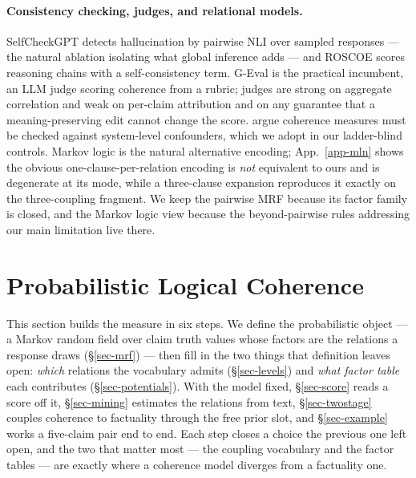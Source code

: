 \paragraph{Consistency checking, judges, and relational models.} SelfCheckGPT \citep{selfcheckgpt} detects
hallucination by pairwise NLI over sampled responses --- the natural ablation isolating what global inference
adds --- and ROSCOE \citep{roscoe} scores reasoning chains with a self-consistency term. G-Eval \citep{geval} is
the practical incumbent, an LLM judge scoring coherence from a rubric; judges are strong on aggregate
correlation and weak on per-claim attribution and on any guarantee that a meaning-preserving edit cannot change
the score. \citet{steenmarkert} argue coherence measures must be checked against system-level confounders,
which we adopt in our ladder-blind controls. Markov logic \citep{mln} is the natural alternative encoding;
App.~\ref{app-mln} shows the obvious one-clause-per-relation encoding is \emph{not} equivalent to ours and is
degenerate at its mode, while a three-clause expansion reproduces it exactly on the three-coupling fragment. We
keep the pairwise MRF because its factor family is closed, and the Markov logic view because the
beyond-pairwise rules addressing our main limitation live there.

\section{Probabilistic Logical Coherence}
\label{sec-coherence}

This section builds the measure in six steps. We define the probabilistic object --- a Markov random field over
claim truth values whose factors are the relations a response draws (\S\ref{sec-mrf}) --- then fill in the two
things that definition leaves open: \emph{which} relations the vocabulary admits (\S\ref{sec-levels}) and
\emph{what factor table} each contributes (\S\ref{sec-potentials}). With the model fixed, \S\ref{sec-score} reads
a score off it, \S\ref{sec-mining} estimates the relations from text, \S\ref{sec-twostage} couples coherence to
factuality through the free prior slot, and \S\ref{sec-example} works a five-claim pair end to end. Each step
closes a choice the previous one left open, and the two that matter most --- the coupling vocabulary and the
factor tables --- are exactly where a coherence model diverges from a factuality one.

